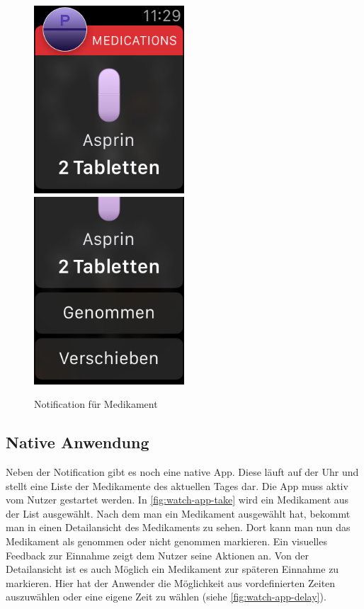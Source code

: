 \begin{figure}
	\caption{Notification für Medikament}
	\label{fig:watch-app-notification}
	\includegraphics[width=0.5\textwidth]{04_realisation/screenshots/watch/notification01.png}
	\includegraphics[width=0.5\textwidth]{04_realisation/screenshots/watch/notification02.png}
\end{figure}

\subsection{Native Anwendung}
Neben der Notification gibt es noch eine native App. Diese läuft auf der Uhr und stellt eine Liste der Medikamente des aktuellen Tages dar. Die App muss aktiv vom Nutzer gestartet werden. In \ref{fig:watch-app-take} wird ein Medikament aus der List ausgewählt. Nach dem man ein Medikament ausgewählt hat, bekommt man in einen Detailansicht des Medikaments zu sehen. Dort kann man nun das Medikament als genommen oder nicht genommen markieren. Ein visuelles Feedback zur Einnahme zeigt dem Nutzer seine Aktionen an. Von der Detailansicht ist es auch Möglich ein Medikament zur späteren Einnahme zu markieren. Hier hat der Anwender die Möglichkeit aus vordefinierten Zeiten auszuwählen oder eine eigene Zeit zu wählen (siehe \ref{fig:watch-app-delay}). 

